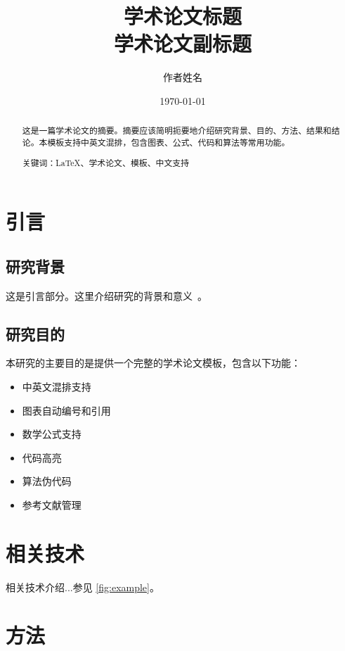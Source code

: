 \documentclass[12pt, a4paper]{article}
\title{学术论文标题\\
\large 学术论文副标题}
\author{作者姓名}
\date{\today}
\begin{document}
\maketitle

\begin{abstract}
这是一篇学术论文的摘要。摘要应该简明扼要地介绍研究背景、目的、方法、结果和结论。本模板支持中英文混排，包含图表、公式、代码和算法等常用功能。

关键词：LaTeX、学术论文、模板、中文支持
\end{abstract}

\newpage
\tableofcontents
\newpage


\section{引言}

\subsection{研究背景}
这是引言部分。这里介绍研究的背景和意义~\cite{example2024}。

\subsection{研究目的}
本研究的主要目的是提供一个完整的学术论文模板，包含以下功能：
\begin{itemize}
    \item 中英文混排支持
    \item 图表自动编号和引用
    \item 数学公式支持
    \item 代码高亮
    \item 算法伪代码
    \item 参考文献管理
\end{itemize}

\section{相关技术}
\label{sec:related}

相关技术介绍...参见 \cref{fig:example}。

\section{方法}
\end{document}
